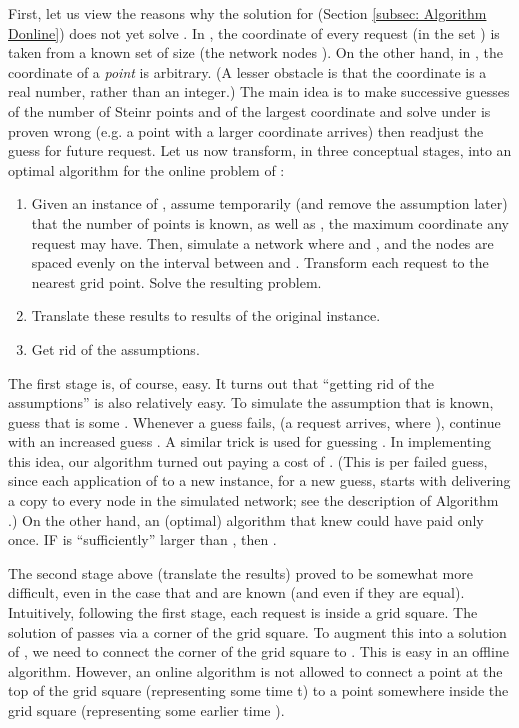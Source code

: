 \documentclass[11pt]{article}
\begin{document}
First, let us view the reasons why the  solution for  (Section \ref{subsec: Algorithm Donline}) does not yet solve .
In ,  the  coordinate of every request (in the set ) is taken from a known set of size  (the network nodes ).
On the other hand, in , the  coordinate of a {\em point} is arbitrary.
(A lesser obstacle is that the  coordinate is a real number, rather than an integer.)
The main idea is to make successive guesses of the number of Steinr points and of the largest  coordinate and solve under is proven wrong
(e.g. a point with a larger  coordinate arrives) then readjust the guess for future request.
Let us now transform, in three conceptual stages,  into an optimal algorithm for the online problem of :
\vspace{-0.2cm}
\begin{enumerate}
     \item Given an instance of , assume temporarily (and remove the assumption later) that the number  of points is known, as well as , the maximum  coordinate any request may have. Then, simulate a network where  and , and the  nodes are spaced evenly on the interval between  and . Transform each  request to the nearest grid point. Solve the resulting  problem.

     \item Translate  these results to results of the original
            instance.

\item  Get rid of the assumptions.
\end{enumerate}
\vspace{-0.2cm}
The first stage is, of course, easy. It turns out that ``getting rid of the assumptions'' is also relatively easy.
To simulate the assumption that  is known, guess that  is some .
Whenever a guess fails, (a request  arrives, where ), continue with an increased guess .
A similar trick is used for guessing . In implementing this idea, our algorithm turned out paying a cost of .
(This is  per failed guess, since each application of  to a new instance, for a new guess, starts with delivering a copy to every node in the simulated network; see the description of Algorithm .) On the other hand, an (optimal) algorithm that knew  could have paid  only once.
IF  is ``sufficiently'' larger than , then .






The second stage above (translate the results) proved to be somewhat more difficult, even in the case that  and  are known (and even if they are equal).
Intuitively, following the first stage, each request  is inside a grid square. The solution of  passes via a corner of the grid square. To augment this into a solution of , we need to connect the corner of the grid square to
 . This is easy in an offline algorithm. However, an online algorithm is not allowed to connect a point at the top of the grid square (representing some time t) to a point somewhere inside the grid square (representing some earlier time ).
\end{document}
